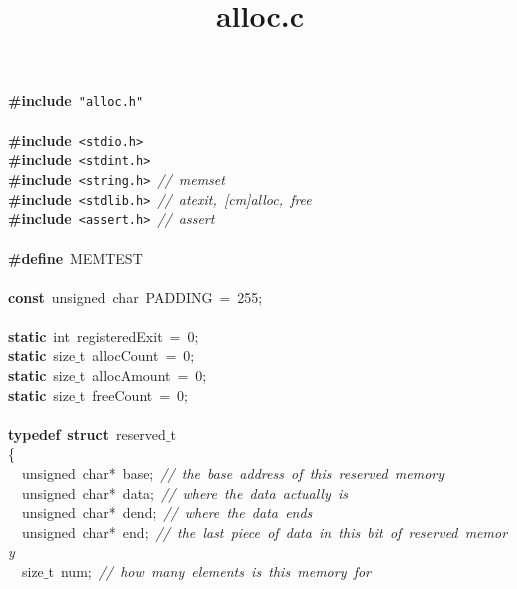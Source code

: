 \documentclass{article}
\title{alloc.c}
\date{}
\begin{document}
\maketitle

\noindent
\mbox{}\textbf{\#include}\ \texttt{"{}alloc.h"{}} \\
\mbox{} \\
\mbox{}\textbf{\#include}\ \texttt{\textless{}stdio.h\textgreater{}} \\
\mbox{}\textbf{\#include}\ \texttt{\textless{}stdint.h\textgreater{}} \\
\mbox{}\textbf{\#include}\ \texttt{\textless{}string.h\textgreater{}}\ \textit{//\ memset} \\
\mbox{}\textbf{\#include}\ \texttt{\textless{}stdlib.h\textgreater{}}\ \textit{//\ atexit,\ [cm]alloc,\ free} \\
\mbox{}\textbf{\#include}\ \texttt{\textless{}assert.h\textgreater{}}\ \textit{//\ assert} \\
\mbox{} \\
\mbox{}\textbf{\#define}\ MEMTEST \\
\mbox{} \\
\mbox{}\textbf{const}\ unsigned\ char\ PADDING\ =\ 255; \\
\mbox{} \\
\mbox{}\textbf{static}\ int\ registeredExit\ =\ 0; \\
\mbox{}\textbf{static}\ size$\_$t\ allocCount\ =\ 0; \\
\mbox{}\textbf{static}\ size$\_$t\ allocAmount\ =\ 0; \\
\mbox{}\textbf{static}\ size$\_$t\ freeCount\ =\ 0; \\
\mbox{} \\
\mbox{}\textbf{typedef}\ \textbf{struct}\ reserved$\_$t \\
\mbox{}\{ \\
\mbox{}\ \ unsigned\ char*\ base;\ \textit{//\ the\ base\ address\ of\ this\ reserved\ memory} \\
\mbox{}\ \ unsigned\ char*\ data;\ \textit{//\ where\ the\ data\ actually\ is} \\
\mbox{}\ \ unsigned\ char*\ dend;\ \textit{//\ where\ the\ data\ ends} \\
\mbox{}\ \ unsigned\ char*\ end;\ \textit{//\ the\ last\ piece\ of\ data\ in\ this\ bit\ of\ reserved\ memory} \\
\mbox{}\ \ size$\_$t\ num;\ \textit{//\ how\ many\ elements\ is\ this\ memory\ for} \\
\end{document}
